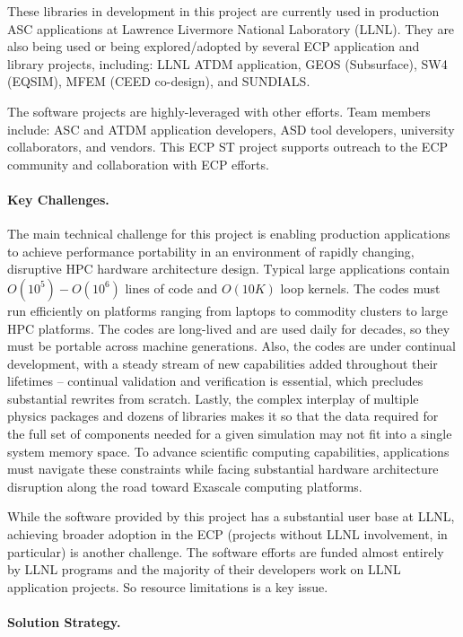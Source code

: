 These libraries in development in this project are currently used in production
ASC applications at Lawrence Livermore National Laboratory (LLNL). They are
also being used or being explored/adopted by several ECP application and
library projects, including: LLNL ATDM application, GEOS (Subsurface), SW4
(EQSIM), MFEM (CEED co-design), and SUNDIALS.

The software projects are highly-leveraged with other efforts. Team members
include: ASC and ATDM application developers, ASD tool developers, university
collaborators, and vendors. This ECP ST project supports outreach to the ECP
community and collaboration with ECP efforts.

\paragraph{Key Challenges.}

The main technical challenge for this project is enabling production
applications to achieve performance portability in an environment of rapidly
changing, disruptive HPC hardware architecture design. Typical large
applications contain $O(10^5) - O(10^6)$ lines of code and $O(10K)$ loop
kernels. The codes must run efficiently on platforms ranging from laptops to
commodity clusters to large HPC platforms. The codes are long-lived and are
used daily for decades, so they must be portable across machine generations.
Also, the codes are under continual development, with a steady stream of new
capabilities added throughout their lifetimes -- continual validation and
verification is essential, which precludes substantial rewrites from scratch.
Lastly, the complex interplay of multiple physics packages and dozens of
libraries makes it so that the data required for the full set of components
needed for a given simulation may not fit into a single system memory space. To
advance scientific computing capabilities, applications must navigate these
constraints while facing substantial hardware architecture disruption along the
road toward Exascale computing platforms. 

While the software provided by this project has a substantial user base at
LLNL, achieving broader adoption in the ECP (projects without LLNL involvement,
in particular) is another challenge. The software efforts are funded almost
entirely by LLNL programs and the majority of their developers work on LLNL
application projects. So resource limitations is a key issue.

\paragraph{Solution Strategy.}

